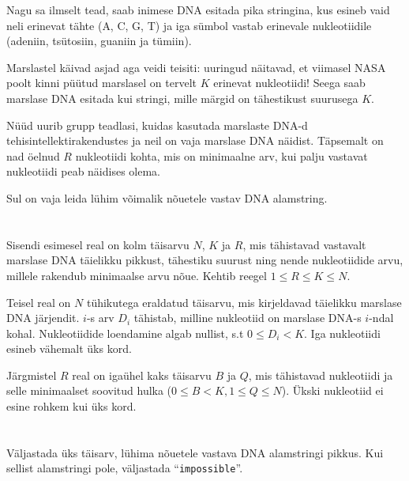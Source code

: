 \ifx\boi\undefined\fi
\def\version{jury-1}
Nagu sa ilmselt tead, saab inimese DNA esitada pika stringina, kus esineb vaid
neli erinevat tähte ({A, C, G, T}) ja iga sümbol vastab erinevale nukleotiidile
(adeniin, tsütosiin, guaniin ja tümiin).

Marslastel käivad asjad aga veidi teisiti: uuringud näitavad, et viimasel NASA 
poolt kinni püütud marslasel on tervelt $K$ erinevat nukleotiidi! Seega saab marslase
DNA esitada kui stringi, mille märgid on tähestikust suurusega $K$.

Nüüd uurib grupp teadlasi, kuidas kasutada marslaste DNA-d tehisintellektirakendustes ja
neil on vaja marslase DNA näidist. Täpsemalt on nad öelnud $R$ nukleotiidi kohta,
mis on minimaalne arv, kui palju vastavat nukleotiidi peab näidises olema. 

Sul on vaja leida lühim võimalik nõuetele vastav DNA alamstring.

\section*{}
Sisendi esimesel real on kolm täisarvu $N$, $K$ ja $R$, mis tähistavad vastavalt marslase DNA 
täielikku pikkust, tähestiku suurust ning nende nukleotiidide arvu, millele rakendub minimaalse arvu nõue. 
Kehtib reegel $1 \le R \le K \le N$.

Teisel real on $N$ tühikutega eraldatud täisarvu, mis kirjeldavad täielikku marslase DNA järjendit.
$i$-s arv $D_i$ tähistab, milline nukleotiid on marslase DNA-s $i$-ndal kohal. Nukleotiidide loendamine
algab nullist, s.t $0 \leq D_i < K$. Iga nukleotiidi esineb vähemalt üks kord.

Järgmistel $R$ real on igaühel kaks täisarvu $B$ ja $Q$, mis tähistavad nukleotiidi ja selle minimaalset
soovitud hulka ($0 \le B < K, 1 \le Q \le N$).
Ükski nukleotiid ei esine rohkem kui üks kord.

\section*{\outputsection}
Väljastada üks täisarv, lühima nõuetele vastava DNA alamstringi pikkus. Kui sellist alamstringi pole,
väljastada ``\texttt{impossible}''.

\section*{\constraints}
\testgroups

